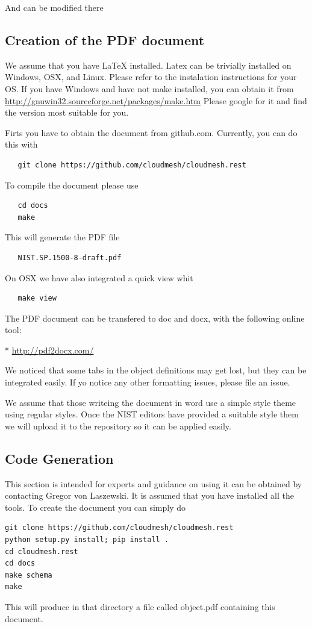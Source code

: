 \documentclass[10pt]{article}
\begin{document}
And can be modified there

\subsection{Creation of the PDF document}

We assume that you have LaTeX installed. Latex can be trivially
installed on Windows, OSX, and Linux. Please refer to the instalation
instructions for your OS. If you have Windows and have not make installed, you can
obtain it from \url{http://gnuwin32.sourceforge.net/packages/make.htm}
Please google for it and find the version most suitable for you.

Firts you have to obtain the document from github.com. Currently, you
can do this with 

\begin{verbatim}
   git clone https://github.com/cloudmesh/cloudmesh.rest
\end{verbatim}

To compile the document please use 

\begin{verbatim}
   cd docs
   make
\end{verbatim}

This will generate the PDF file 

\begin{verbatim}
   NIST.SP.1500-8-draft.pdf
\end{verbatim}

On OSX we have also integrated a quick view whit 

\begin{verbatim}
   make view
\end{verbatim}

The PDF document can be transfered to doc and docx, with the following
online tool:

* \url{http://pdf2docx.com/}

We noticed that some tabs in the object definitions may get lost, but
they can be integrated easily. If yo notice any other formatting
issues, please file an issue.

We assume that those writeing the document in word use a simple style
theme using regular styles. Once the NIST editors have provided a
suitable style them we will upload it to the repository so it can be
applied easily.

\subsection{Code Generation}

This section is intended for experts and guidance on using it can be
obtained by contacting Gregor von Laszewski. It is assumed that you
have installed all the tools. To create the document you can simply do

\begin{Verbatim}
git clone https://github.com/cloudmesh/cloudmesh.rest
python setup.py install; pip install .
cd cloudmesh.rest
cd docs
make schema
make
\end{Verbatim}

This will produce in that directory a file called object.pdf
containing this document. 
\end{document}
